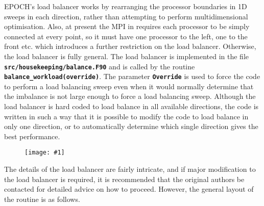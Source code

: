 \documentclass[12pt,a4paper]{article}
\newcommand{\inlinecode}[1]{{\color{warwickred} \bf\texttt{#1}}}
\newcommand{\EPOCH}{{\color{warwickdark}\fontfamily{phv}\selectfont{EPOCH}}}
\newcommand{\image}[1]
  {{\begin{figure}\centering\texttt{[image: \#1]}\end{figure}}}
\begin{document}
EPOCH's load balancer works by rearranging the processor boundaries in 1D
sweeps in each direction, rather than attempting to perform multidimensional
optimisation. Also, at present the MPI in {\EPOCH} requires each processor to be
simply connected at every point, so it must have one processor to the left, one
to the front etc. which introduces a further restriction on the load
balancer. Otherwise, the load balancer is fully general. The load balancer is
implemented in the file \inlinecode{src/housekeeping/balance.F90} and is called
by the routine \inlinecode{balance\_workload(override)}. The parameter
\inlinecode{Override} is used to force the code to perform a load balancing
sweep even when it would normally determine that the imbalance is not large
enough to force a load balancing sweep. Although the load balancer is hard
coded to load balance in all available directions, the code is written in such
a way that it is possible to modify the code to load balance in only one
direction, or to automatically determine which single direction gives the best
performance.

\image{./images/sweep}

The details of the load balancer are fairly intricate, and if major
modification to the load balancer is required, it is recommended that the
original authors be contacted for detailed advice on how to proceed. However,
the general layout of the routine is as follows.
\end{document}
